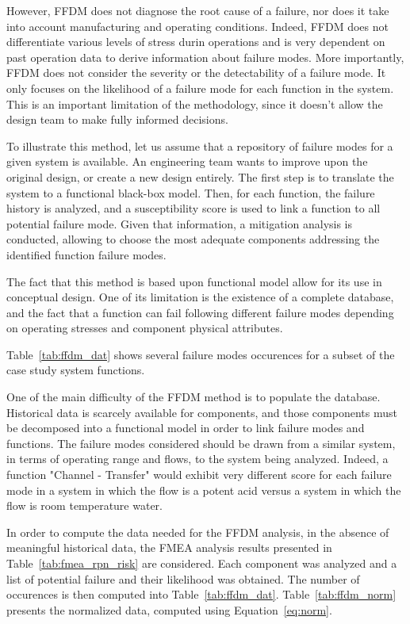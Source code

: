 However, FFDM does not diagnose the root cause of a failure, nor does it take into account manufacturing and operating conditions. Indeed, FFDM does not differentiate various levels of stress durin operations and is very dependent on past operation data to derive information about failure modes. More importantly, FFDM does not consider the severity or the detectability of a failure mode. It only focuses on the likelihood of a failure mode for each function in the system. This is an important limitation of the methodology, since it doesn't allow the design team to make fully informed decisions.

To illustrate this method, let us assume that a repository of failure modes for a given system is available. An engineering team wants to improve upon the original design, or create a new design entirely. The first step is to translate the system to a functional black-box model. Then, for each function, the failure history is analyzed, and a susceptibility score is used to link a function to all potential failure mode. Given that information, a mitigation analysis is conducted, allowing to choose the most adequate components addressing the identified function failure modes.

The fact that this method is based upon functional model allow for its use in conceptual design. One of its limitation is the existence of a complete database, and the fact that a function can fail following different failure modes depending on operating stresses and component physical attributes.

Table~\ref{tab:ffdm_dat} shows several failure modes occurences for a subset of the case study system functions.

One of the main difficulty of the FFDM method is to populate the database. Historical data is scarcely available for components, and those components must be decomposed into a functional model in order to link failure modes and functions. The failure modes considered should be drawn from a similar system, in terms of operating range and flows, to the system being analyzed. Indeed, a function "Channel - Transfer" would exhibit very different score for each failure mode in a system in which the flow is a potent acid versus a system in which the flow is room temperature water.

In order to compute the data needed for the FFDM analysis, in the absence of meaningful historical data, the FMEA analysis results presented in Table~\ref{tab:fmea_rpn_risk} are considered. Each component was analyzed and a list of potential failure and their likelihood was obtained. The number of occurences is then computed into Table~\ref{tab:ffdm_dat}. Table~\ref{tab:ffdm_norm} presents the normalized data, computed using Equation~\ref{eq:norm}.

